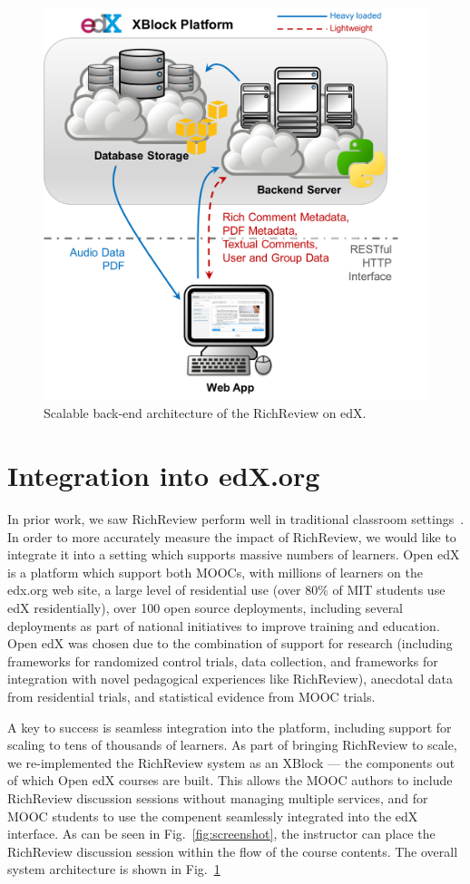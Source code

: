 \documentclass{sigchi}
\begin{document}
\begin{figure}[!h]
\centering
\includegraphics[width=0.85\columnwidth]{figure_architecture}
\caption{Scalable back-end architecture of the RichReview on edX.}
\label{fig:scalable}
\end{figure}

\section{Integration into edX.org} 

In prior work, we saw RichReview perform well in traditional classroom settings~\cite{yoon2015richreview}.
In order to more accurately measure the impact of RichReview, we would like to integrate it into a setting which supports massive numbers of learners. 
Open edX is a platform which support both MOOCs, with millions of learners on the edx.org web site, a large level of residential use (over 80\% of MIT students use edX residentially), over 100 open source deployments, including several deployments as part of national initiatives to improve training and education.
Open edX was chosen due to the combination of support for research (including frameworks for randomized control trials, data collection, and frameworks for integration with novel pedagogical experiences like RichReview), anecdotal data from residential trials, and statistical evidence from MOOC trials. 

A key to success is seamless integration into the platform, including support for scaling to tens of thousands of learners. As part of bringing RichReview to scale, we re-implemented the RichReview system as an XBlock --- the components out of which Open edX courses are built.
This allows the MOOC authors to include RichReview discussion sessions without managing multiple services, and for MOOC students to use the compenent seamlessly integrated into the edX interface.
As can be seen in Fig.~\ref{fig:screenshot}, the instructor can place the RichReview discussion session within the flow of the course contents. The overall system architecture is shown in Fig.~\ref{fig:scalable}
\end{document}
